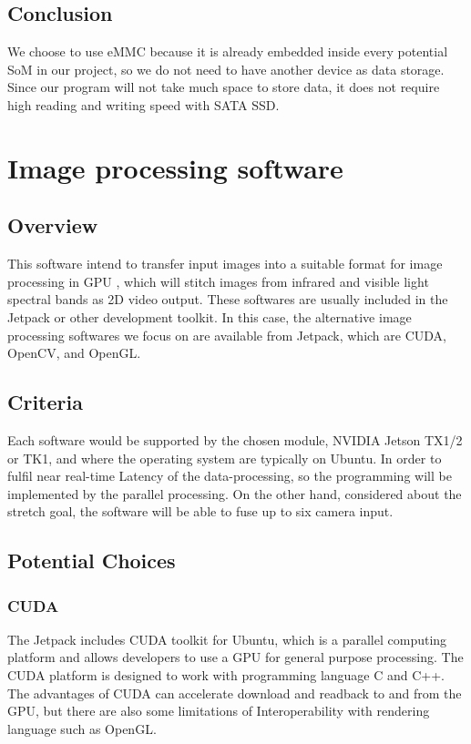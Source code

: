 \documentclass[letterpaper,10pt,serif,draftclsnofoot,onecolumn,compsoc,titlepage]{IEEEtran}
\begin{document}
\subsection{Conclusion}
We choose to use eMMC because it is already embedded inside every potential SoM in our project, 
so we do not need to have another device as data storage. Since our program will not take much space 
to store data, it does not require high reading and writing speed with SATA SSD. \\



\section{Image processing software}
\subsection{Overview}
This software intend to transfer input images into a suitable format for image processing in GPU
, which will stitch images from infrared and visible light spectral bands as 2D video output. 
These softwares are usually included in the Jetpack or other development toolkit. In this case, 
the alternative image processing softwares we focus on are available from Jetpack, which are CUDA, 
OpenCV, and OpenGL.\\

\subsection{Criteria}
Each software would be supported by the chosen module, NVIDIA Jetson TX1/2 or TK1, and where 
the operating system are typically on Ubuntu. In order to fulfil near real-time Latency of 
the data-processing, so the programming will be implemented by the parallel processing. On 
the other hand, considered about the stretch goal, the software will be able to fuse up to 
six camera input.\\

\subsection{Potential Choices}
\subsubsection{CUDA}
The Jetpack includes CUDA toolkit for Ubuntu, which is a parallel computing platform and 
allows developers to use a GPU for general purpose processing. The CUDA platform is designed 
to work with programming language C and C++. The advantages of CUDA can accelerate download 
and readback to and from the GPU, but there are also some limitations of Interoperability 
with rendering language such as OpenGL.\\
\end{document}

